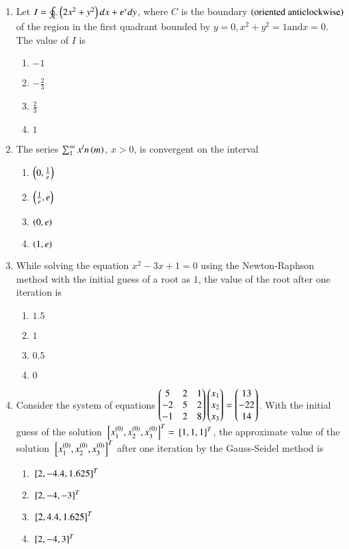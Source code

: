 \documentclass[journal,12pt,onecolumn]{IEEEtran}
\theoremstyle{remark}
\begin{document}
\begin{enumerate}
\item Let $I = \oint_{C}\left(2x^2 + y^2\right)dx + e^{y}dy$, where $C$ is the boundary $\left(\text{oriented anticlockwise}\right)$ of the region in the first quadrant bounded by $y=0,x^2 + y^2 = 1 \text{and} x=0$. The value of $I$ is
\begin{enumerate}
\item $-1$
\item $-\frac{2}{3}$
\item $\frac{2}{3}$
\item $1$
\end{enumerate}

\item The series $\sum_{1}^{\infty} x^ln\left(m\right)$, $x>0$, is convergent on the interval
\begin{enumerate}
\item $\left(0,\frac{1}{e}\right)$
\item $\left(\frac{1}{e},e\right)$
\item $\left(0,e\right)$
\item $\left(1,e\right)$
\end{enumerate}

\item While solving the equation $x^2 - 3x + 1=0$ using the Newton-Raphson method with the initial guess of a root as $1$, the value of the root after one iteration is
\begin{enumerate}
\item $1.5$
\item $1$
\item $0.5$
\item $0$
\end{enumerate}

\item Consider the system of equations
$\begin{pmatrix}5 & 2 & 1\\-2 & 5 & 2\\-1 & 2 & 8\end{pmatrix}\begin{pmatrix}x_1\\x_2\\x_3\end{pmatrix}=\begin{pmatrix}13\\-22\\14\end{pmatrix}$.
With the initial guess of the solution ${}\left[x_{1}^{\left(0\right)},x_{2}^{\left(0\right)},x_{3}^{\left(0\right)}\right]^{T} = {}\left[1,1,1\right]^{T}$, the approximate value of the solution ${}\left[x_{1}^{\left(0\right)},x_{2}^{\left(0\right)},x_{3}^{\left(0\right)}\right]^{T}$ after one iteration by the Gauss-Seidel method is
\begin{enumerate}
\item ${}\left[2,-4.4,1.625\right]^{T}$
\item ${}\left[2,-4,-3\right]^{T}$
\item ${}\left[2,4.4,1.625\right]^{T}$
\item ${}\left[2,-4,3\right]^{T}$
\end{enumerate}


\end{enumerate}
\end{document}
